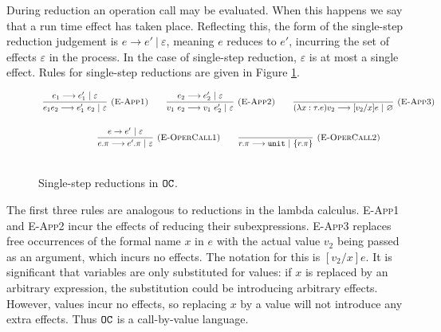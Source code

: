 During reduction an operation call may be evaluated. When this happens we say that a run time effect has taken place. Reflecting this, the form of the single-step reduction judgement is $e \longrightarrow e'~|~\varepsilon$, meaning $e$ reduces to $e'$, incurring the set of effects $\varepsilon$ in the process. In the case of single-step reduction, $\varepsilon$ is at most a single effect. Rules for single-step reductions are given in Figure \ref{fig:opercalc_singlestep}.

\begin{figure}[h]

\noindent
{}

\[
\begin{array}{c}

\infer[\textsc{(E-App1)}]
	{e_1 e_2 \longrightarrow e_1'~ e_2~|~\varepsilon}
	{e_1 \longrightarrow e_1'~|~\varepsilon}
    
	\hspace{5ex}
    
\infer[\textsc{(E-App2)}]
	{v_1 ~ e_2 \longrightarrow v_1 ~ e_2'~|~\varepsilon} 
	{e_2 \longrightarrow e_2'~|~\varepsilon}
    
	\hspace{5ex}
    
\infer[\textsc{(E-App3)}]
	{ (\lambda x: \tau. e) v_2 \longrightarrow [ v_2/x] e~|~\varnothing }
	{}\\[4ex]
	
\infer[\textsc{(E-OperCall1)}]
	{ e.\pi \longrightarrow  e'.\pi~|~\varepsilon }
	{ e \rightarrow  e'~|~\varepsilon}
		
	\hspace{5ex}
	
\infer[\textsc{(E-OperCall2)}]
	{r.\pi \longrightarrow \kwa{unit}~|~\{ r.\pi \} }
	{}
	 \\[4ex]
	 
\end{array}
\]


\vspace{-7pt}
\caption{Single-step reductions in $\mathtt{OC}$.}
\label{fig:opercalc_singlestep}
\end{figure}

The first three rules are analogous to reductions in the lambda calculus. \textsc{E-App1} and \textsc{E-App2} incur the effects of reducing their subexpressions. \textsc{E-App3} replaces free occurrences of the formal name $x$ in $e$ with the actual value $v_2$ being passed as an argument, which incurs no effects. The notation for this is $[v_2/x]e$. It is significant that variables are only substituted for values: if $x$ is replaced by an arbitrary expression, the substitution could be introducing arbitrary effects. However, values incur no effects, so replacing $x$ by a value will not introduce any extra effects. Thus $\mathtt{OC}$ is a call-by-value language.

